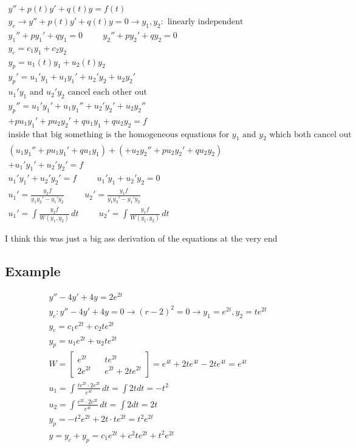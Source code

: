 \documentclass[fleqn]{report}
\newcommand{\hp}{\hspace{1cm}}
\newcommand{\equations} [1] {
\begin{gather*}
#1
\end{gather*}
}
\begin{document}
\equations{
y'' + p(t) y' + q(t) y = f(t)
\\
y_c \rightarrow y'' + p(t) y' + q(t) y = 0
\rightarrow
y_1, y_2: \textrm{ linearly independent}
\\
y_1'' + py_1' + qy_1 = 0
\hp
y_2'' + py_2' + qy_2 = 0
\\
y_c = c_1 y_1 + c_2 y_2
\\
y_p = u_1(t) y_1 + u_2 (t) y_2
\\
y_p' = u_1' y_1 + u_1 y_1' + u_2' y_2 + u_2 y_2'
\\
\textrm{$u_1' y_1$ and $u_2' y_2$ cancel each other out}
\\
y_p'' = u_1' y_1' + u_1 y_1'' + u_2' y_2' + u_2 y_2'' 
\\
+ p u_1 y_1' + pu_2 y_2' + q u_1 y_1 + q u_2 y_2 = f
\\
\textrm{inside that big something is the homogeneous equations for $y_1$ and $y_2$ which both cancel out}
\\
(u_1 y_1'' + p u_1 y_1'  + q u_1 y_1) + (+ u_2 y_2'' + pu_2 y_2'  + q u_2 y_2 ) 
\\
+ u_1' y_1' + u_2' y_2'  = f
\\
u_1' y_1' + u_2' y_2'  = f
\hp
u_1' y_1 + u_2' y_2 = 0
\\
u_1' = \frac{y_2 f}{y_1 y_2' - y_1' y_2}
\hp
u_2' = \frac{y_1 f}{y_1 y_2' - y_1' y_2}
\\
u_1' = \int \frac{y_2 f}{W(y_1, y_2)} \, dt
\hp
u_2' = \int \frac{y_1 f}{W(y_1, y_2)} \, dt
}

I think this was just a big ass derivation of the equations at the very end

\subsection{Example}
\equations{
y'' - 4y' + 4y = 2e^{2t}
\\
y_c: y'' - 4y' + 4y = 0 
\rightarrow 
(r - 2)^2 = 0
\rightarrow 
y_1 = e^{2t}, y_2 = te^{2t}
\\
y_c = c_1 e^{2t} + c_2 te^{2t}
\\
y_p = u_1 e^{2t} + u_2 t e^{2t}
\\
W = \begin{bmatrix}
e^{2t} && te^{2t}\\
2e^{2t} && e^{2t} + 2te^{2t}
\end{bmatrix}
=
e^{4t} + 2te^{4t} - 2t e^{4t}
=
e^{4t}
\\
u_1 = \int \frac{
te^{2t} \cdot 2e^{2t}
}
{
e^{4t}
} \, dt = \int 2t dt = -t^2
\\
u_2 = \int \frac
{
e^{2t} \cdot 2e^{2t}
}
{
e^{4t}
} \, dt = \int 2 dt = 2t
\\
y_p = -t^2 e^{2t} + 2t \cdot te^{2t} = t^2 e^{2t}
\\
y = y_c + y_p = c_1 e^{2t} + c^2 te^{2t} + t^2 e^{2t}
}
 
\end{document}
